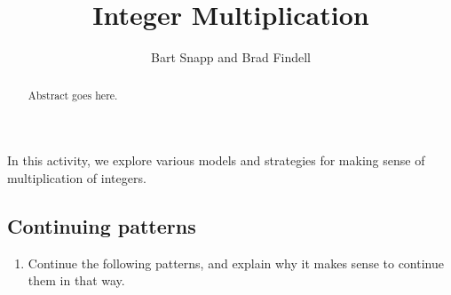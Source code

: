 \documentclass{ximera}
\title{Integer Multiplication}
\author{Bart Snapp and Brad Findell}
\begin{document}
\begin{abstract}
Abstract goes here.  
\end{abstract}
\maketitle

\label{A:integerMultiplication}

In this activity, we explore various models and strategies for 
making sense of multiplication of integers.  

\subsection*{Continuing patterns}
\begin{problem}
\begin{enumerate}
\item Continue the following patterns, and explain why it makes sense to continue them in that way.    


\end{enumerate}
\end{problem}
\end{document}
